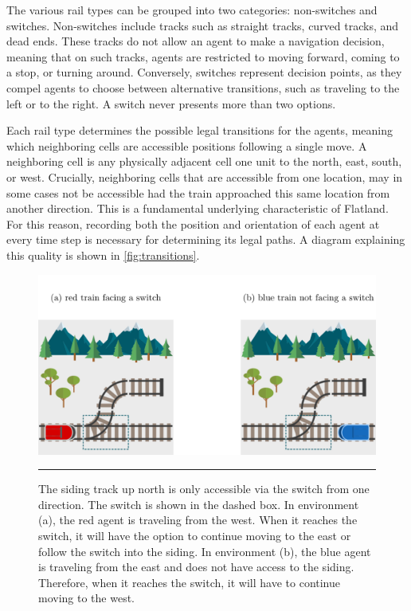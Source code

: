 \documentclass[11pt]{article}
\begin{document}
The various rail types can be grouped into two categories: non-switches and switches.  Non-switches include tracks such as straight tracks, curved tracks, and dead ends.  These tracks do not allow an agent to make a navigation decision, meaning that on such tracks, agents are restricted to moving forward, coming to a stop, or turning around.  Conversely, switches represent decision points, as they compel agents to choose between alternative transitions, such as traveling to the left or to the right.  A switch never presents more than two options.

Each rail type determines the possible legal transitions for the agents, meaning which neighboring cells are accessible positions following a single move.  A neighboring cell is any physically adjacent cell one unit to the north, east, south, or west.  Crucially, neighboring cells that are accessible from one location, may in some cases not be accessible had the train approached this same location from another direction.  This is a fundamental underlying characteristic of Flatland.  For this reason, recording both the position and orientation of each agent at every time step is necessary for determining its legal paths.  A diagram explaining this quality is shown in \autoref{fig:transitions}.

\begin{figure}[t]
\centering
\includegraphics[width=\textwidth]{transitions}
\caption{The siding track up north is only accessible via the switch from one direction.  The switch is shown in the dashed box.  In environment (a), the red agent is traveling from the west.  When it reaches the switch, it will have the option to continue moving to the east or follow the switch into the siding.  In environment (b), the blue agent is traveling from the east and does not have access to the siding.  Therefore, when it reaches the switch, it will have to continue moving to the west.}

\begin{center}
{\color{lightgray} \rule{\linewidth}{0.15mm}}
\end{center}

\label{fig:transitions}
\end{figure}
\end{document}

